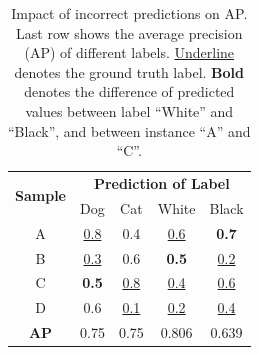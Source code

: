 \begin{table}[t]
\footnotesize
\caption{
Impact of incorrect predictions on AP. 
Last row shows the average precision (AP) of different labels. \underline{Underline} denotes the ground truth label.  \textbf{Bold} denotes the difference of predicted values between label ``White'' and ``Black'', and between instance ``A'' and ``C''. }
\centering
\begin{tabular}{c|cccc}
\toprule[0.15em]
\multirow{2}{*}{\textbf{Sample}} & \multicolumn{4}{c}{\textbf{Prediction of Label}} \\ 
& Dog & Cat & White & Black \\ 
\toprule[0.15em]
A & \underline{0.8} & 0.4 & \underline{0.6} & \textbf{0.7} \\ 
B & \underline{0.3} & 0.6 & \textbf{0.5} & \underline{0.2} \\ 
C & \textbf{0.5} & \underline{0.8} & \underline{0.4} & \underline{0.6} \\
D & 0.6 & \underline{0.1} & \underline{0.2} & \underline{0.4} \\ 
\hline
\textbf{AP} & 0.75 & 0.75 & 0.806 & 0.639 \\ 
\toprule[0.15em]
\end{tabular}
\label{tab:wrong}
\end{table}